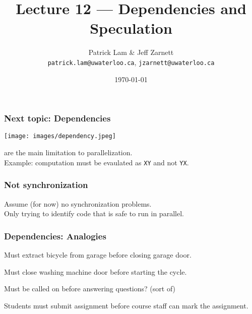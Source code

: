 
\usepackage{multirow}

\title{Lecture 12 --- Dependencies and Speculation }

\author{Patrick Lam \& Jeff Zarnett \\ \small \texttt{patrick.lam@uwaterloo.ca}, \texttt{jzarnett@uwaterloo.ca}}
\date{\today}




\begin{frame}
  \titlepage

 \end{frame}

\begin{frame}
  \frametitle{Next topic: Dependencies}

\begin{center}
	\texttt{[image: images/dependency.jpeg]}
\end{center}

      are the main
      limitation to parallelization.\\[1em]
     Example: computation must be evaulated as {\tt XY} and not {\tt YX}.\\[1em]
  
\end{frame}

\begin{frame}
  \frametitle{Not synchronization}

  
      Assume (for now) no synchronization problems.\\[1em]
      Only trying to identify code that is safe to run in
      parallel.

  
\end{frame}

\begin{frame}
\frametitle{Dependencies: Analogies}

Must extract bicycle from garage before closing garage door.

Must close washing machine door before starting the cycle.

Must be called on before answering questions? (sort of)

Students must submit assignment before course staff can mark the assignment.

\end{frame}


